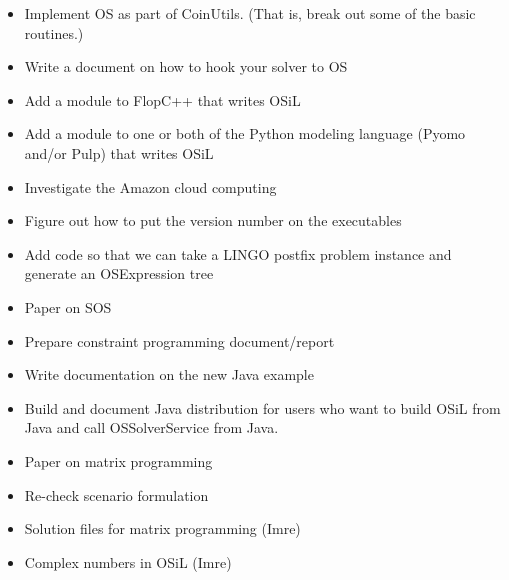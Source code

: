 
\ifbible

\label{section:wishlist} 

\begin{itemize}

\item Implement OS as part of CoinUtils. (That is, break out some of the basic routines.)

\item Write a document on how to hook your solver to OS

\item Add a module to FlopC++ that writes OSiL

\item Add a module to one or both of the Python modeling language (Pyomo and/or Pulp) that writes OSiL

\item Investigate the Amazon cloud computing

\item Figure out how to put the version number on the executables

\item Add code so that we can take a LINGO postfix problem instance and generate an OSExpression tree

\item Paper on SOS

\item Prepare constraint programming document/report


\item Write documentation on the new Java example 

\item Build and document Java distribution for users who want to build OSiL from Java and 
call OSSolverService from Java. 

\item Paper on matrix programming

\item Re-check scenario formulation

\item Solution files for matrix programming (Imre)

\item Complex numbers in OSiL (Imre)


\end{itemize}
